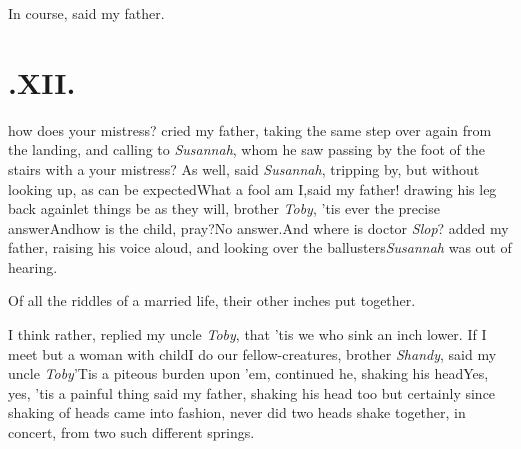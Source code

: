 \documentclass[twoside]{article}
\begin{document}
\tsk In course, said my father.

\vfill


\newpage\null{}\baselineskip
\section{.\enspace XII.}

 how does your mistress?\break
cried my father, taking the\break
same step over again from the landing, and calling to
\textit{Susannah}, whom he saw passing by the foot of the
stairs with a 
your mistress? As well, said \textit{Susannah}, tripping by, but
without looking up, as can be expected\tsk What a fool am
I,\break said my father! drawing his leg back again\tsk let things
be as they will, brother \textit{Toby}, ’tis ever the
precise answer\tsk And\break how is the child, pray?\tsk No
answer.\break And where is doctor \textit{Slop}?  added my\break
father, raising his voice aloud, and looking over the
ballusters\tsk \textit{Susannah} was out of hearing.

Of all the riddles of a married life,
their other inches put together.

I think rather, replied my uncle \textit{Toby}, that ’tis we who sink an inch lower.\tsh
If I meet but a woman with child\tsk I do
our fellow-creatures, brother \textit{Shandy},\break
said my uncle \textit{Toby}\tsk ’Tis a
piteous burden upon ’em, continued he, shaking his head\tsk Yes, yes, ’tis a painful
thing\tsk\break
said my father, shaking his head too\tsk\break
but certainly since shaking of heads
came into fashion, never did two heads shake together, in concert, from two such
different springs.
\end{document}
